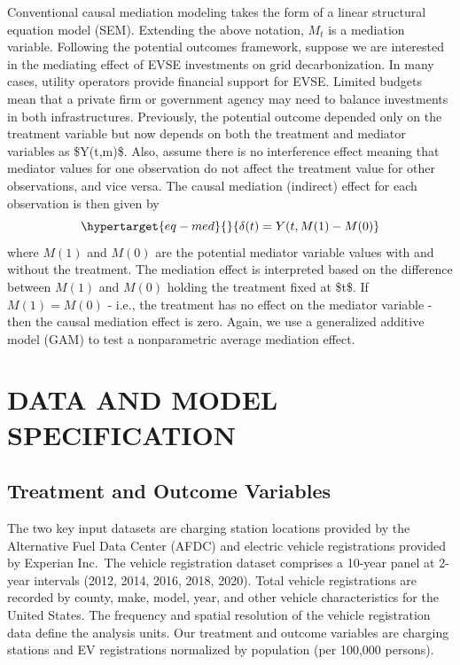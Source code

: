 \documentclass[
  letterpaper,
  DIV=11,
  numbers=noendperiod]{scrartcl}
\begin{document}
Conventional causal mediation modeling takes the form of a linear
structural equation model (SEM). Extending the above notation, \(M_t\)
is a mediation variable. Following the potential outcomes framework,
suppose we are interested in the mediating effect of EVSE investments on
grid decarbonization. In many cases, utility operators provide financial
support for EVSE. Limited budgets mean that a private firm or government
agency may need to balance investments in both infrastructures.
Previously, the potential outcome depended only on the treatment
variable but now depends on both the treatment and mediator variables as
\$Y(t,m)\$. Also, assume there is no interference effect meaning that
mediator values for one observation do not affect the treatment value
for other observations, and vice versa. The causal mediation (indirect)
effect for each observation is then given by
\begin{equation}\protect\hypertarget{eq-med}{}{\delta(t)=Y(t,M(1)-M(0)}\label{eq-med}\end{equation}
where \(M(1)\) and \(M(0)\) are the potential mediator variable values
with and without the treatment. The mediation effect is interpreted
based on the difference between \(M(1)\) and \(M(0)\) holding the
treatment fixed at \$t\$. If \(M(1)=M(0)\) - i.e., the treatment has no
effect on the mediator variable - then the causal mediation effect is
zero. Again, we use a generalized additive model (GAM) to test a
nonparametric average mediation effect.

\hypertarget{data-and-model-specification}{%
\section{DATA AND MODEL
SPECIFICATION}\label{data-and-model-specification}}

\hypertarget{treatment-and-outcome-variables}{%
\subsection{Treatment and Outcome
Variables}\label{treatment-and-outcome-variables}}

The two key input datasets are charging station locations provided by
the Alternative Fuel Data Center (AFDC) and electric vehicle
registrations provided by Experian Inc.~The vehicle registration dataset
comprises a 10-year panel at 2-year intervals (2012, 2014, 2016, 2018,
2020). Total vehicle registrations are recorded by county, make, model,
year, and other vehicle characteristics for the United States. The
frequency and spatial resolution of the vehicle registration data define
the analysis units. Our treatment and outcome variables are charging
stations and EV registrations normalized by population (per 100,000
persons).
\end{document}
